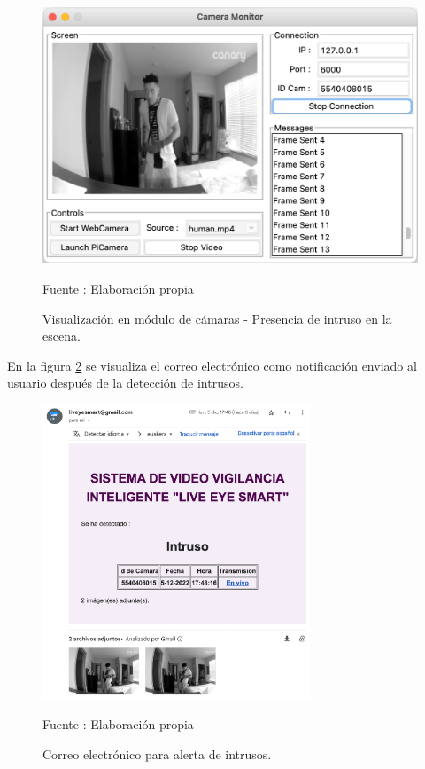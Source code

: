\begin{figure}[H]
    \begin{center}
        \includegraphics[width=12cm]{img/capitulo_6/human.png}
    \end{center}
    \begin{center}
        \caption{Visualización en módulo de cámaras - Presencia de intruso en la escena.}
        Fuente : Elaboración propia
        \label{camera_human_siluete}
    \end{center}
\end{figure}

En la figura \ref{mail_human_siluete} se visualiza el correo electrónico como notificación enviado al usuario después de la detección de intrusos.

\begin{figure}[H]
    \begin{center}
        \includegraphics[width=8cm]{img/capitulo_6/mail_human.png}
    \end{center}
    \begin{center}
        \caption{Correo electrónico para alerta de intrusos.}
        Fuente : Elaboración propia
        \label{mail_human_siluete}
    \end{center}
\end{figure}

